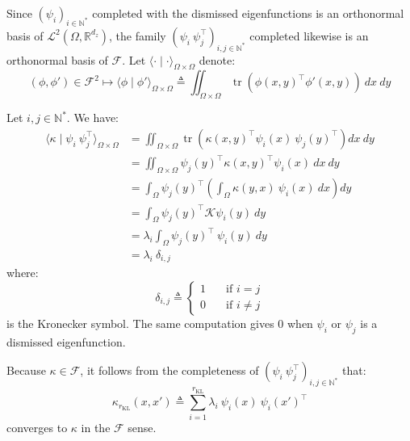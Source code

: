 Since $(\psi_i)_{i\in\mathbb{N}^*}$ completed with the dismissed eigenfunctions is an orthonormal basis of $\mathcal{L}^2(\Omega,\mathbb{R}^{d_z})$, the family $(\psi_i\:\psi_j^\top)_{i,j\in\mathbb{N}^*}$ completed likewise is an orthonormal basis of $\mathcal{F}$. Let $\langle\cdot\mid\cdot\rangle_{\Omega\times\Omega}$ denote:
\begin{equation}
	(\phi,\phi')\in\mathcal{F}^2\mapsto\langle\phi\mid\phi'\rangle_{\Omega\times\Omega}\triangleq\iint_{\Omega\times\Omega}{\operatorname{tr}\left(\phi(x,y)^\top\phi'(x,y)\right)\:dx\:dy}
\end{equation}

Let $i,j\in\mathbb{N}^*$. We have:
\begin{equation}
	\begin{aligned}
		\langle \kappa\mid\psi_i\:\psi_j^\top\rangle_{\Omega\times\Omega}&=\iint_{\Omega\times\Omega}{\operatorname{tr}\left(\kappa(x,y)^\top\psi_i(x)\:\psi_j(y)^\top\right)dx\:dy}\\
		&=\iint_{\Omega\times\Omega}{\psi_j(y)^\top \kappa(x,y)^\top\psi_i(x)\:dx\:dy}\\
		&=\int_{\Omega}{\psi_j(y)^\top\left(\int_{\Omega}{\kappa(y,x)\:\psi_i(x)\:dx}\right)dy}\\
		&=\int_{\Omega}{\psi_j(y)^\top\mathcal{K}\psi_i(y)\:dy}\\
		&=\lambda_i\int_{\Omega}{\psi_j(y)^\top\:\psi_i(y)\:dy}\\
		&=\lambda_i\:\delta_{i,j}
	\end{aligned}
\end{equation}
where:
\begin{equation}
	\delta_{i,j}\triangleq\left\{\begin{aligned}
	1&\quad\text{if }i=j\\0&\quad\text{if }i\neq j
	\end{aligned}\right.
\end{equation}
is the Kronecker symbol. The same computation gives $0$ when $\psi_i$ or $\psi_j$ is a dismissed eigenfunction.

Because $\kappa\in\mathcal{F}$, it follows from the completeness of $(\psi_i\:\psi_j^\top)_{i,j\in\mathbb{N}^*}$ that:
\begin{equation}
	\kappa_{r_{\mathrm{KL}}}(x,x')\triangleq\sum_{i=1}^{r_{\mathrm{KL}}}\lambda_i\:\psi_i(x)\:\psi_i(x')^\top
\end{equation}
converges to $\kappa$ in the $\mathcal{F}$ sense.

